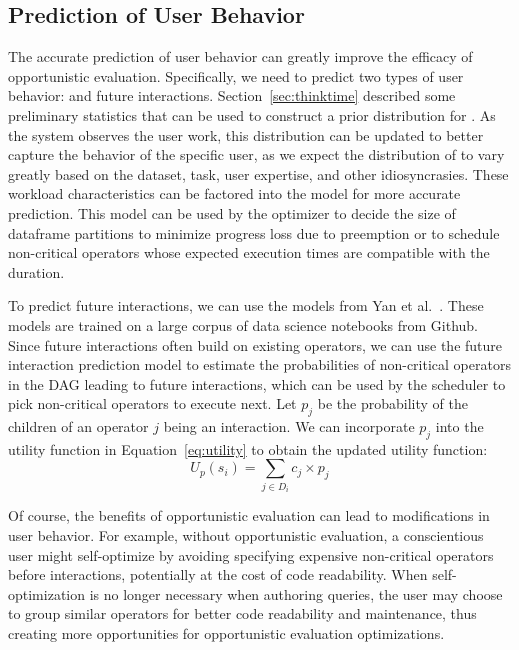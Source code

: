 \subsection{Prediction of User Behavior}
\label{sec:user}
The accurate prediction of user behavior can greatly improve the efficacy of opportunistic evaluation. 
Specifically, we need to predict two types of user behavior: \thinktime 
and future interactions. 
Section~\ref{sec:thinktime} described some preliminary statistics that can be used to construct a prior distribution for \thinktime. As the system observes the user work, this distribution can be updated to better capture the behavior of the specific user, as we expect the distribution of \thinktime to vary greatly based on the dataset, task, user expertise, and other idiosyncrasies. These workload characteristics can be factored into the \thinktime model for more accurate prediction. This \thinktime model can be used by the optimizer to decide the size of dataframe partitions to minimize progress loss due to preemption or to schedule non-critical operators whose expected execution times are compatible with the \thinktime duration.


To predict future interactions, we can use the models from Yan et al.~\cite{yan2020auto}.
These models are trained on a large corpus of data science notebooks from Github. 
Since future interactions often build on existing operators, we can use the future interaction prediction model to estimate the probabilities of non-critical operators in the DAG leading to future interactions, which can be used by the scheduler to pick non-critical operators to execute next.
Let $p_j$ be the probability of the children of an operator $j$ being an interaction. We can incorporate $p_j$ into the utility function in Equation~\ref{eq:utility} to obtain the updated utility function:
\begin{equation}
    U_p(s_i) = \sum_{j \in D_i} {c_j \times p_j}
\end{equation}

Of course, the benefits of opportunistic evaluation can lead to modifications in user behavior. For example, without opportunistic evaluation, a conscientious user might self-optimize by avoiding specifying expensive non-critical operators before interactions, potentially at the cost of code readability. When self-optimization is no longer necessary when authoring queries, the user may choose to group similar operators for better code readability and maintenance, thus creating more opportunities for opportunistic evaluation optimizations. 